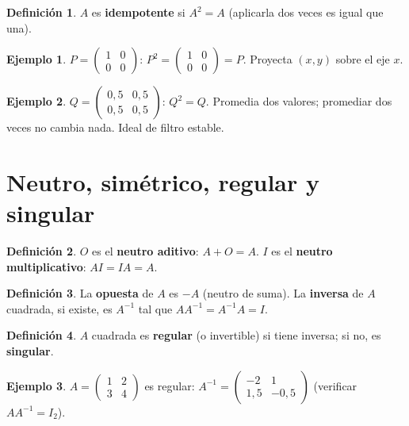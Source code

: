 \documentclass[a4paper,12pt]{article}
\theoremstyle{definition}
\newtheorem{definicion}{Definición}[section]
\newtheorem{ejemplo}{Ejemplo}[section]
\begin{document}
\begin{definicion}
$A$ es \textbf{idempotente} si $A^2=A$ (aplicarla dos veces es igual que una).
\end{definicion}

\begin{ejemplo}
$P=\begin{pmatrix} 1 & 0 \\ 0 & 0 \end{pmatrix}$: $P^2=\begin{pmatrix} 1 & 0 \\ 0 & 0 \end{pmatrix}=P$. Proyecta $(x,y)$ sobre el eje $x$.
\end{ejemplo}

\begin{ejemplo}
$Q=\begin{pmatrix} 0{,}5 & 0{,}5 \\ 0{,}5 & 0{,}5 \end{pmatrix}$: $Q^2=Q$. Promedia dos valores; promediar dos veces no cambia nada. Ideal de filtro estable.
\end{ejemplo}

\section{Neutro, simétrico, regular y singular}
\begin{definicion}
$O$ es el \textbf{neutro aditivo}: $A+O=A$. $I$ es el \textbf{neutro multiplicativo}: $AI=IA=A$.
\end{definicion}

\begin{definicion}
La \textbf{opuesta} de $A$ es $-A$ (neutro de suma). La \textbf{inversa} de $A$ cuadrada, si existe, es $A^{-1}$ tal que $AA^{-1}=A^{-1}A=I$.
\end{definicion}

\begin{definicion}
$A$ cuadrada es \textbf{regular} (o invertible) si tiene inversa; si no, es \textbf{singular}.
\end{definicion}

\begin{ejemplo}
$A=\begin{pmatrix} 1 & 2 \\ 3 & 4 \end{pmatrix}$ es regular: $A^{-1}=\begin{pmatrix} -2 & 1 \\ 1{,}5 & -0{,}5 \end{pmatrix}$ (verificar $AA^{-1}=I_2$).
\end{ejemplo}
\end{document}
